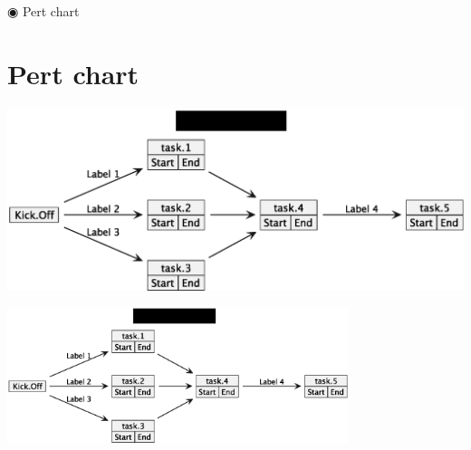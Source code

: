 \documentclass[11pt]{article}
\author{Ricardo Antunes}
\date{\today}
\title{}
\begin{document}
\tableofcontents

◉ Pert chart
\section{Pert chart}
\label{sec:orgb479b61}


\begin{center}
\includegraphics[width=.9\linewidth]{Resources/pert_chart.eps}
\end{center}

\label{fig_pert_chart}
\begin{center}
\includegraphics[height=150]{Resources/pert_chart.eps}
\end{center}
\end{document}

